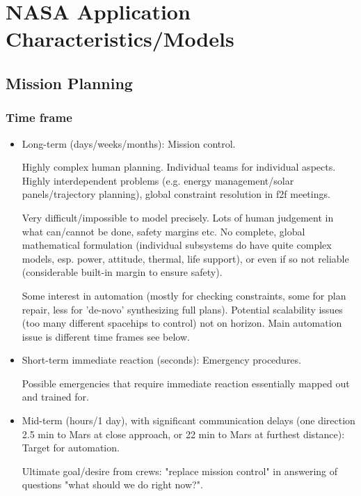 \section{NASA Application Characteristics/Models}


















\subsection{Mission Planning}

\subsubsection{Time frame}

\begin{itemize}
\item Long-term (days/weeks/months): Mission control.

    Highly complex human planning. Individual teams for individual
    aspects. Highly interdependent problems (e.g. energy
    management/solar panels/trajectory planning), global constraint
    resolution in f2f meetings.
    
    Very difficult/impossible to model precisely. Lots of human
    judgement in what can/cannot be done, safety margins etc. No
    complete, global mathematical formulation (individual subsystems
    do have quite complex models, esp. power, attitude, thermal, life
    support), or even if so not reliable (considerable built-in margin
    to ensure safety).
    
    Some interest in automation (mostly for checking constraints, some
    for plan repair, less for 'de-novo' synthesizing full
    plans). Potential scalability issues (too many different spacehips
    to control) not on horizon. Main automation issue is different
    time frames see below.
    
\item Short-term immediate reaction (seconds): Emergency procedures.

    Possible emergencies that require immediate reaction essentially
    mapped out and trained for.

\item Mid-term (hours/1 day), with significant communication delays
  (one direction 2.5 min to Mars at close approach, or 22 min to Mars
  at furthest distance): Target for automation.

    Ultimate goal/desire from crews: "replace mission control" in
    answering of questions "what should we do right now?".
    
\end{itemize}



